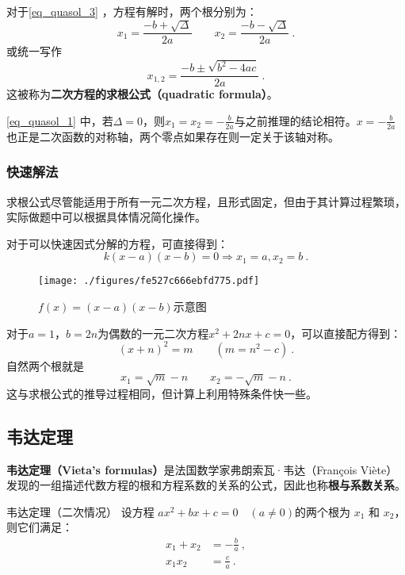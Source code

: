 对于\autoref{eq_quasol_3} ，方程有解时，两个根分别为：
\begin{equation}\label{eq_quasol_1}
x_1=\frac{-b+\sqrt{\Delta}}{2a}\qquad x_2=\frac{-b-\sqrt{\Delta}}{2a}~.
\end{equation}
或统一写作
\begin{equation}
x_{1,2} = \frac{-b \pm \sqrt{b^2 - 4ac}}{2a}~.
\end{equation}
这被称为\textbf{二次方程的求根公式（quadratic formula）}。

\autoref{eq_quasol_1} 中，若$\Delta = 0$，则$\displaystyle x_1=x_2=-\frac{b}{2a}$与之前推理的结论相符。$\displaystyle x=-\frac{b}{2a}$也正是二次函数的对称轴，两个零点如果存在则一定关于该轴对称。


\subsubsection{快速解法}

求根公式尽管能适用于所有一元二次方程，且形式固定，但由于其计算过程繁琐，实际做题中可以根据具体情况简化操作。

对于可以快速因式分解的方程，可直接得到：
$$k(x-a)(x-b)=0\Rightarrow x_1=a, x_2=b~.$$
\begin{figure}[ht]
\centering
\texttt{[image: ./figures/fe527c666ebfd775.pdf]}
\caption{$f(x)=(x-a)(x-b)$示意图} \label{fig_quasol_2}
\end{figure}

对于$a=1$，$b=2n$为偶数的一元二次方程$x^2+2nx+c=0$，可以直接配方得到：
\begin{equation}
(x+n)^2=m\qquad(m=n^2-c)~.
\end{equation}
自然两个根就是
\begin{equation}
x_1=\sqrt{m}-n\qquad x_2=-\sqrt{m}-n~.
\end{equation}
这与求根公式的推导过程相同，但计算上利用特殊条件快一些。

\subsection{韦达定理}

\textbf{韦达定理（Vieta's formulas）}是法国数学家弗朗索瓦·韦达（François Viète）发现的一组描述代数方程的根和方程系数的关系的公式，因此也称\textbf{根与系数关系}。

\begin{theorem}{韦达定理（二次情况）}
设方程 $a x^2 + b x + c = 0\quad(a \neq 0)$的两个根为 $x_1$ 和 $x_2$，则它们满足：
$$\begin{aligned}
x_1 + x_2 &= -\frac{b}{a} ~,\\
x_1 x_2 &= \frac{c}{a}~.
\end{aligned}$$
\end{theorem}

